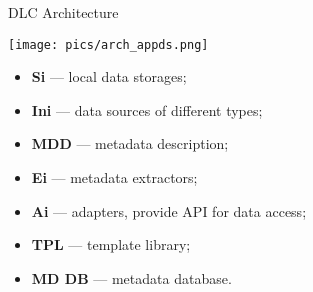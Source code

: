 \begin{frame}{DLC Architecture}
\begin{minipage}[c]{0.63\textwidth}
  \texttt{[image: pics/arch\_appds.png]}
\end{minipage}
\hfill
\begin{minipage}[c]{0.36\textwidth}
  \small
  \begin{itemize}
    \setlength{\itemsep}{0pt}
    \item\textbf{Si} — local data storages;
    \item\textbf{Ini} — data sources of different types;
    \item\textbf{MDD} — metadata description;
    \item\textbf{Ei} — metadata extractors;
    \item\textbf{Ai} — adapters, provide API for data access;
    \item\textbf{TPL} — template library;
    \item\textbf{MD DB} — metadata database.
  \end{itemize}
\end{minipage}
\end{frame}

